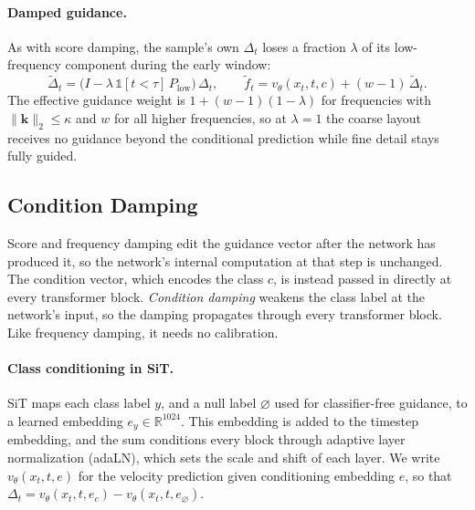 \documentclass[sigconf,nonacm]{acmart}
\newcommand{\Dt}{\Delta_t}
\newcommand{\ind}[1]{\mathbb{1}[#1]}
\begin{document}
\paragraph{Damped guidance.}
As with score damping, the sample's own $\Dt$ loses a fraction $\lambda$ of its low-frequency component during the early window:
\begin{equation}
  \tilde{\Delta}_t = \big(I - \lambda\, \ind{t < \tau}\, P_{\text{low}}\big)\, \Dt ,
  \qquad
  \tilde{f}_t = v_\theta(x_t, t, c) + (w-1)\,\tilde{\Delta}_t .
  \label{eq:freq-damp}
\end{equation}
The effective guidance weight is $1 + (w-1)(1-\lambda)$ for frequencies with $\lVert \mathbf{k} \rVert_2 \le \kappa$ and $w$ for all higher frequencies, so at $\lambda = 1$ the coarse layout receives no guidance beyond the conditional prediction while fine detail stays fully guided.

\subsection{Condition Damping}
\label{sec:condition}

Score and frequency damping edit the guidance vector after the network has produced it, so the network's internal computation at that step is unchanged. The condition vector, which encodes the class $c$, is instead passed in directly at every transformer block. \emph{Condition damping} weakens the class label at the network's input, so the damping propagates through every transformer block. Like frequency damping, it needs no calibration.

\paragraph{Class conditioning in SiT.}
SiT maps each class label $y$, and a null label $\varnothing$ used for classifier-free guidance, to a learned embedding $e_y \in \mathbb{R}^{1024}$. This embedding is added to the timestep embedding, and the sum conditions every block through adaptive layer normalization (adaLN), which sets the scale and shift of each layer. We write $v_\theta(x_t, t, e)$ for the velocity prediction given conditioning embedding $e$, so that $\Dt = v_\theta(x_t, t, e_c) - v_\theta(x_t, t, e_\varnothing)$.
\end{document}
